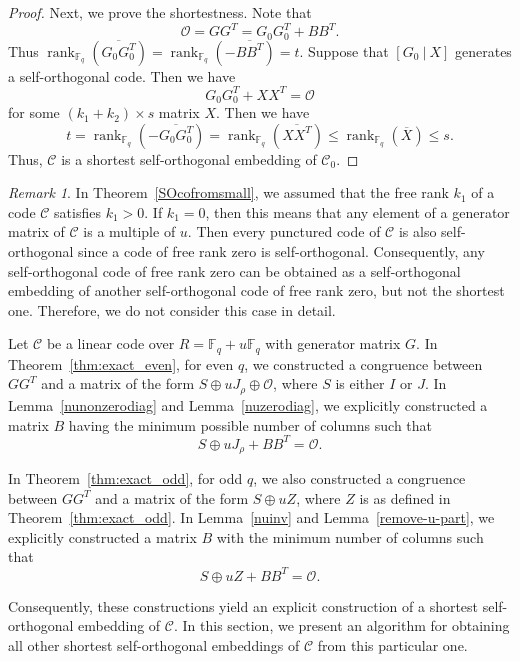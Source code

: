 \documentclass{article}
\theoremstyle{definition}
\theoremstyle{remark}
\newtheorem{remark}{Remark}
\begin{document}
\begin{proof}
    Next, we prove the shortestness. Note that
    \[
    \mathcal{O}=GG^T=G_0G_0^T+BB^T.
    \]
    Thus $\operatorname{rank}_{\mathbb{F}_q}(\overline{G_0G_0^T})=\operatorname{rank}_{\mathbb{F}_q}(-\overline{BB^T})=t$. Suppose that $[G_0~|~X]$ generates a self-orthogonal code. Then we have
    \[
    G_0G_0^T+XX^T=\mathcal{O}
    \]
    for some $(k_1+k_2)\times s$ matrix $X$. Then we have
    \[
    t=\operatorname{rank}_{\mathbb{F}_q}(-\overline{G_0G_0^T})=\operatorname{rank}_{\mathbb{F}_q}(\overline{XX^T})\le \operatorname{rank}_{\mathbb{F}_q}(\overline{X})\le s.
    \]
    Thus, $\mathcal{C}$ is a shortest self-orthogonal embedding of $\mathcal{C}_0$.
\end{proof}

\begin{remark}
    In Theorem~\ref{SOcofromsmall}, we assumed that the free rank $k_1$ of a code $\mathcal{C}$ satisfies $k_1>0$. If $k_1=0$, then this means that any element of a generator matrix of $\mathcal{C}$ is a multiple of $u$. Then every punctured code of $\mathcal{C}$ is also self-orthogonal since a code of free rank zero is self-orthogonal. Consequently, any self-orthogonal code of free rank zero can be obtained as a self-orthogonal embedding of another self-orthogonal code of free rank zero, but not the shortest one. Therefore, we do not consider this case in detail.
\end{remark}

Let $\mathcal{C}$ be a linear code over $R=\mathbb{F}_q+u\mathbb{F}_q$ with generator matrix $G$. In Theorem~\ref{thm:exact_even}, for even $q$, we constructed a congruence between $GG^T$ and a matrix of the form $S\oplus uJ_\rho\oplus \mathcal{O}$, where $S$ is either $I$ or $J$. In Lemma~\ref{nunonzerodiag} and Lemma~\ref{nuzerodiag}, we explicitly constructed a matrix $B$ having the minimum possible number of columns such that
\[
S\oplus uJ_\rho+ BB^T=\mathcal{O}.
\]

In Theorem~\ref{thm:exact_odd}, for odd $q$, we also constructed a congruence between $GG^T$ and a matrix of the form $S\oplus uZ$, where $Z$ is as defined in Theorem~\ref{thm:exact_odd}. In Lemma~\ref{nuinv} and Lemma~\ref{remove-u-part}, we explicitly constructed a matrix $B$ with the minimum number of columns such that
\[
S\oplus uZ+BB^T=\mathcal{O}.
\]

Consequently, these constructions yield an explicit construction of a shortest self-orthogonal embedding of $\mathcal{C}$. In this section, we present an algorithm for obtaining all other shortest self-orthogonal embeddings of $\mathcal{C}$ from this particular one.
\end{document}
